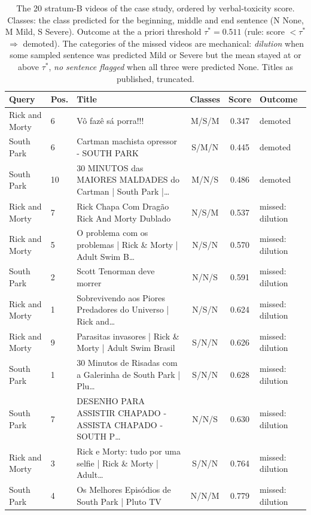 \begin{table}[!t]
\centering
\small
\caption{The 20 stratum-B videos of the case study, ordered by verbal-toxicity score. Classes: the class predicted for the beginning, middle and end sentence (N None, M Mild, S Severe). Outcome at the a priori threshold $\tau^{*} = 0.511$ (rule: score $< \tau^{*}$ $\Rightarrow$ demoted). The categories of the missed videos are mechanical: \emph{dilution} when some sampled sentence was predicted Mild or Severe but the mean stayed at or above $\tau^{*}$, \emph{no sentence flagged} when all three were predicted None. Titles as published, truncated.}
\label{tab:estrato-b}
\begin{tabular}{@{}llp{}ccl@{}}
\toprule
Query & Pos. & Title & Classes & Score & Outcome \\
\midrule
Rick and Morty & 6 & Vô fazê sá porra!!! & M/S/M & 0.347 & demoted \\
South Park & 6 & Cartman machista opressor - SOUTH PARK & S/M/N & 0.445 & demoted \\
South Park & 10 & 30 MINUTOS das MAIORES MALDADES do Cartman | South Park |… & M/N/S & 0.486 & demoted \\
Rick and Morty & 7 & Rick Chapa Com Dragão Rick And Morty Dublado & N/S/M & 0.537 & missed: dilution \\
Rick and Morty & 5 & O problema com os problemas | Rick \& Morty | Adult Swim B… & N/S/N & 0.570 & missed: dilution \\
South Park & 2 & Scott Tenorman deve morrer & N/N/S & 0.591 & missed: dilution \\
Rick and Morty & 1 & Sobrevivendo aos Piores Predadores do Universo | Rick and… & N/S/N & 0.624 & missed: dilution \\
Rick and Morty & 9 & Parasitas invasores | Rick \& Morty | Adult Swim Brasil & S/N/N & 0.626 & missed: dilution \\
South Park & 1 & 30 Minutos de Risadas com a Galerinha de South Park | Plu… & S/N/N & 0.628 & missed: dilution \\
South Park & 7 & DESENHO PARA ASSISTIR CHAPADO - ASSISTA CHAPADO - SOUTH P… & N/N/S & 0.630 & missed: dilution \\
Rick and Morty & 3 & Rick e Morty: tudo por uma selfie | Rick \& Morty | Adult… & S/N/N & 0.764 & missed: dilution \\
South Park & 4 & Os Melhores Episódios de South Park | Pluto TV & N/N/M & 0.779 & missed: dilution \\

\end{tabular}
\end{table}
